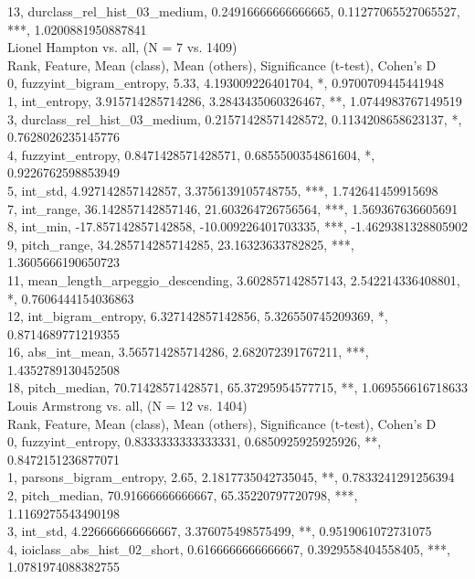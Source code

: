 13, durclass_rel_hist_03_medium, 0.24916666666666665, 0.11277065527065527, ***, 1.0200881950887841\\
Lionel Hampton vs. all, (N = 7 vs. 1409)\\
Rank, Feature, Mean (class), Mean (others), Significance (t-test), Cohen's D\\
0, fuzzyint_bigram_entropy, 5.33, 4.193009226401704, *, 0.9700709445441948\\
1, int_entropy, 3.915714285714286, 3.2843435060326467, **, 1.0744983767149519\\
3, durclass_rel_hist_03_medium, 0.21571428571428572, 0.1134208658623137, *, 0.7628026235145776\\
4, fuzzyint_entropy, 0.8471428571428571, 0.6855500354861604, *, 0.9226762598853949\\
5, int_std, 4.927142857142857, 3.3756139105748755, ***, 1.742641459915698\\
7, int_range, 36.142857142857146, 21.603264726756564, ***, 1.569367636605691\\
8, int_min, -17.857142857142858, -10.009226401703335, ***, -1.4629381328805902\\
9, pitch_range, 34.285714285714285, 23.16323633782825, ***, 1.3605666190650723\\
11, mean_length_arpeggio_descending, 3.602857142857143, 2.542214336408801, *, 0.7606444154036863\\
12, int_bigram_entropy, 6.327142857142856, 5.326550745209369, *, 0.8714689771219355\\
16, abs_int_mean, 3.565714285714286, 2.682072391767211, ***, 1.4352789130452508\\
18, pitch_median, 70.71428571428571, 65.37295954577715, **, 1.069556616718633\\
Louis Armstrong vs. all, (N = 12 vs. 1404)\\
Rank, Feature, Mean (class), Mean (others), Significance (t-test), Cohen's D\\
0, fuzzyint_entropy, 0.8333333333333331, 0.6850925925925926, **, 0.8472151236877071\\
1, parsons_bigram_entropy, 2.65, 2.1817735042735045, **, 0.7833241291256394\\
2, pitch_median, 70.91666666666667, 65.35220797720798, ***, 1.1169275543490198\\
3, int_std, 4.226666666666667, 3.376075498575499, **, 0.9519061072731075\\
4, ioiclass_abs_hist_02_short, 0.6166666666666667, 0.3929558404558405, ***, 1.0781974088382755\\
